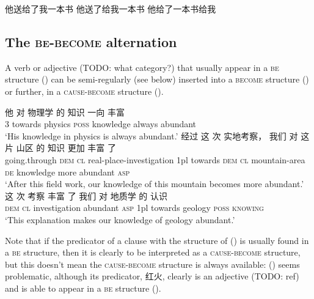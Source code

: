 \documentclass[UTF8, a4paper, oneside, scheme=plain, 12pt]{ctexrep}
\newcommand{\translate}[1]{`#1'}
\newcommand*{\category}[1]{\textsc{#1}}
\begin{document}
\begin{exe}
    \ex 他送给了我一本书
    \ex 他送了给我一本书
    \ex 他给了一本书给我
    \ex 
\end{exe}

\subsection{The \category{be}-\category{become} alternation}\label{sec:vp.be-become}

A verb or adjective (TODO: what category?) that usually appear in a \category{be} structure 
()
can be semi-regularly (see below) inserted into a \category{become} structure 
()
or further, in a \category{cause}-\category{become} structure 
().

\begin{exe}
    \ex\label{ex:verb-phrase.be-become.source-1} 
    \gll 他 对 物理学 的 知识 一向 丰富 \\
    3 towards physics \category{poss} knowledge always abundant \\
    \glt \translate{His knowledge in physics is always abundant.} 
    \ex\label{ex:verb-phrase.be-become.1} 
    \gll 经过 这 次 实地考察， 我们 对 这 片 山区 的 知识 更加 丰富 了 \\
    going.through \category{dem} \category{cl} real-place-investigation 
    1pl towards \category{dem} \category{cl} mountain-area \category{de} knowledge 
    more abundant \category{asp} \\
    \glt \translate{After this field work, our knowledge of this mountain 
    becomes more abundant.}
    \ex\label{ex:verb-phrase.be-become.cause-1}
    \gll 这 次 考察 丰富 了 我们 对 地质学 的 认识 \\
    \category{dem} \category{cl} investigation abundant \category{asp} 1pl towards geology \category{poss} \category{knowing} \\ 
    \glt \translate{This explanation makes our knowledge of geology abundant.}
\end{exe}

Note that if the predicator of 
a clause with the structure of ()
is usually found in a \category{be} structure, 
then it is clearly to be interpreted as a \category{cause}-\category{become} structure, 
but this doesn't mean the \category{cause}-\category{become} structure
is always available: 
() seems problematic,
although its predicator, 红火, clearly is an adjective (TODO: ref)
and is able to appear in a \category{be} structure 
().
\end{document}
